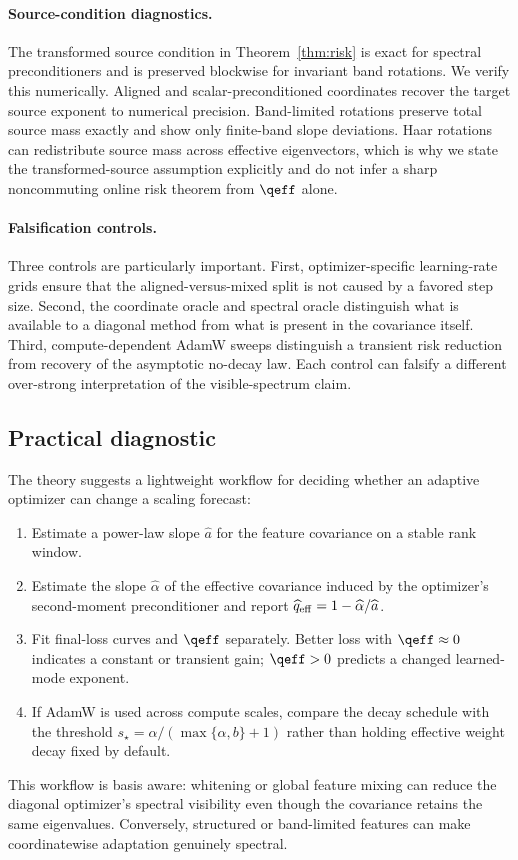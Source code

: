\paragraph{Source-condition diagnostics.}
The transformed source condition in Theorem~\ref{thm:risk} is exact for spectral preconditioners and is preserved blockwise for invariant band rotations.  We verify this numerically.  Aligned and scalar-preconditioned coordinates recover the target source exponent to numerical precision.  Band-limited rotations preserve total source mass exactly and show only finite-band slope deviations.  Haar rotations can redistribute source mass across effective eigenvectors, which is why we state the transformed-source assumption explicitly and do not infer a sharp noncommuting online risk theorem from $\qeff$ alone.

\paragraph{Falsification controls.}
Three controls are particularly important.  First, optimizer-specific learning-rate grids ensure that the aligned-versus-mixed split is not caused by a favored step size.  Second, the coordinate oracle and spectral oracle distinguish what is available to a diagonal method from what is present in the covariance itself.  Third, compute-dependent AdamW sweeps distinguish a transient risk reduction from recovery of the asymptotic no-decay law.  Each control can falsify a different over-strong interpretation of the visible-spectrum claim.

\subsection{Practical diagnostic}

The theory suggests a lightweight workflow for deciding whether an adaptive optimizer can change a scaling forecast:
\begin{enumerate}
 \item Estimate a power-law slope $\widehat a$ for the feature covariance on a stable rank window.
 \item Estimate the slope $\widehat\alpha$ of the effective covariance induced by the optimizer's second-moment preconditioner and report $\widehat q_{\rm eff}=1-\widehat\alpha/\widehat a$.
 \item Fit final-loss curves and $\qeff$ separately.  Better loss with $\qeff\approx0$ indicates a constant or transient gain; $\qeff>0$ predicts a changed learned-mode exponent.
 \item If AdamW is used across compute scales, compare the decay schedule with the threshold $s_\star=\alpha/(\max\{\alpha,b\}+1)$ rather than holding effective weight decay fixed by default.
\end{enumerate}
This workflow is basis aware: whitening or global feature mixing can reduce the diagonal optimizer's spectral visibility even though the covariance retains the same eigenvalues.  Conversely, structured or band-limited features can make coordinatewise adaptation genuinely spectral.


